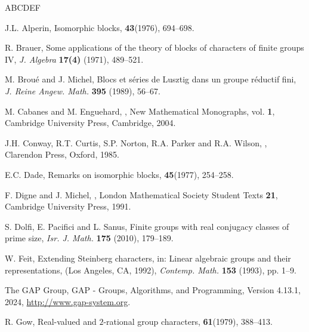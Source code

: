 \documentclass[10pt]{article}
\begin{document}
\begin{thebibliography}{ABCDEF}\setlength{\itemsep}{-2mm} 
\small

J.L. Alperin,
\newblock Isomorphic blocks,
 {\bf43}(1976), 694--698.




	R. Brauer,
	\newblock Some applications of the theory of blocks of characters of finite groups IV,
	\newblock \emph{J. Algebra} {\bf 17(4)} (1971), 489--521.


	M. Brou\'e and J. Michel,
	\newblock Blocs et s\'eries de Lusztig dans un groupe r\'eductif fini,
	\newblock \emph{J. Reine Angew. Math.} {\bf 395} (1989), 56--67.





M. Cabanes and M. Enguehard,
			, New Mathematical Monographs, vol. {\bf 1}, Cambridge University Press, Cambridge, 2004.

	J.H. Conway, R.T. Curtis, S.P. Norton, R.A. Parker and R.A. Wilson,
	,
	\newblock Clarendon Press, Oxford, 1985.

    E.C. Dade,
    \newblock Remarks on isomorphic blocks,
     {\bf45}(1977), 254--258.   

  F. Digne and J. Michel, 
 , 
 London Mathematical Society Student Texts {\bf 21}, 
 Cambridge University Press, 1991.


	S. Dolfi, E. Pacifici and L. Sanus,
	\newblock Finite groups with real conjugacy classes of prime size,
	\newblock \emph{Isr. J. Math.} {\bf 175} (2010), 179--189.

 W. Feit, Extending Steinberg characters, in: Linear algebraic groups and their 
representations,
(Los Angeles, CA, 1992), {\em Contemp. Math.} {\bf 153} (1993), pp. 1--9.


    The GAP Group, GAP - Groups, Algorithms, and Programming, Version 4.13.1, 2024, \href{http://www.gap-system.org}{http://www.gap-system.org}.

	 
   
  R. Gow,
  \newblock Real-valued and $2$-rational group characters,
   {\bf 61}(1979), 388--413.
   


\end{thebibliography}
\end{document}
